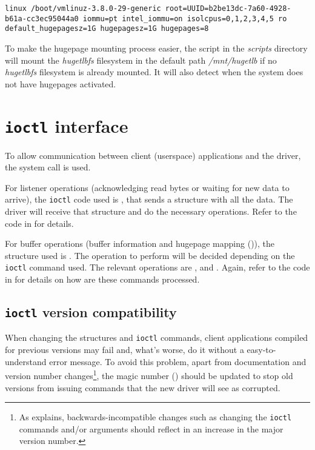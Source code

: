\documentclass[oneside]{hpman}
\begin{document}
\texttt{linux /boot/vmlinuz-3.8.0-29-generic root=UUID=b2be13dc-7a60-4928-b61a-cc3ec95044a0 iommu=pt intel\_iommu=on isolcpus=0,1,2,3,4,5 ro default\_hugepagesz=1G hugepagesz=1G hugepages=8}

To make the hugepage mounting process easier, the script  in the \textit{scripts} directory will mount the \textit{hugetlbfs} filesystem in the default path \textit{/mnt/hugetlb} if no \textit{hugetlbfs} filesystem is already mounted. It will also detect when the system does not have hugepages activated.

\section{\texttt{ioctl} interface}

To allow communication between client (userspace) applications and the driver, the  system call is used.

For listener operations (acknowledging read bytes or waiting for new data to arrive), the \texttt{ioctl} code used is , that sends a  structure with all the data. The driver will receive that structure and do the necessary operations. Refer to the code in  for details.

For buffer operations (buffer information and hugepage mapping ()), the structure used is . The operation to perform will be decided depending on the \texttt{ioctl} command used. The relevant operations are ,  and . Again, refer to the code in  for details on how are these commands processed.

\subsection{\texttt{ioctl} version compatibility}

When changing the structures and \texttt{ioctl} commands, client applications compiled for previous versions may fail and, what's worse, do it without a easy-to-understand error message. To avoid this problem, apart from documentation and version number changes\footnote{As  explains, backwards-incompatible changes such as changing the \texttt{ioctl} commands and/or arguments should reflect in an increase in the major version number.}, the magic number () should be updated to stop old versions from issuing commands that the new driver will see as corrupted.
\end{document}
